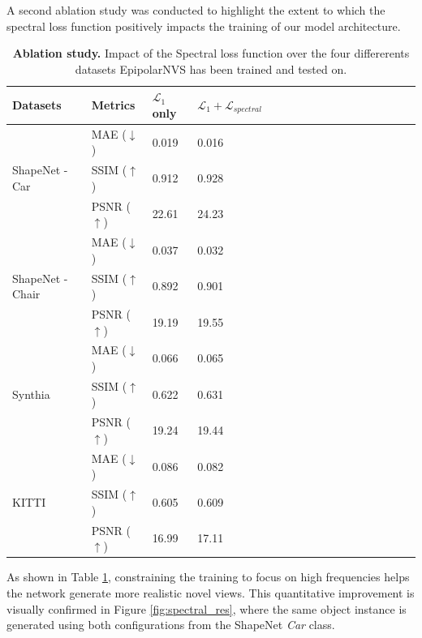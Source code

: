 A second ablation study was conducted to highlight the extent to which the spectral loss function positively impacts the training of our model architecture. 
\begin{table}[h!]
    \caption{\textbf{Ablation study.} Impact of the Spectral loss function over the four differerents datasets EpipolarNVS has been trained and tested on.}
    \label{tab:spectral}
\begin{center}
\begin{tabular}{@{}||lllllllllllllllll@{}}
  \toprule
  Datasets & Metrics  &$\mathcal{L}_{1}$ only  &  $\mathcal{L}_{1}+\mathcal{L}_{spectral}$ &   \\
  \midrule
  \multirow{3}{*}{ShapeNet - Car \citep{chang2015shapenet}} & MAE ($\downarrow$) &\hfil 0.019 & \hfil  \cellcolor{red!25}0.016 \\
  & SSIM ($\uparrow$) & \hfil0.912 & \hfil \cellcolor{red!25}0.928\\
  & PSNR ($\uparrow$)& \hfil22.61 & \hfil \cellcolor{red!25}24.23\\
  \midrule
  \multirow{3}{*}{ShapeNet - Chair \citep{chang2015shapenet}} & MAE ($\downarrow$) & \hfil 0.037 & \hfil \cellcolor{red!25}0.032\\
  & SSIM ($\uparrow$)&\hfil 0.892 & \hfil \cellcolor{red!25}0.901 \\
  & PSNR ($\uparrow$) & \hfil 19.19 & \hfil \cellcolor{red!25}19.55 \\
  \midrule
  \multirow{3}{*}{Synthia \citep{ros2016synthia}} & MAE ($\downarrow$)& \hfil 0.066 & \hfil \cellcolor{red!25}0.065\\
  & SSIM ($\uparrow$)& \hfil 0.622 & \hfil \cellcolor{red!25}0.631 \\
  & PSNR ($\uparrow$)& \hfil 19.24 & \hfil \cellcolor{red!25}19.44\\
  \midrule
  \multirow{3}{*}{KITTI \citep{geiger2012we}} & MAE ($\downarrow$)& \hfil 0.086 & \hfil \cellcolor{red!25}0.082\\
  & SSIM ($\uparrow$)& \hfil 0.605 & \hfil \cellcolor{red!25}0.609 \\
  & PSNR ($\uparrow$)& \hfil 16.99 & \hfil \cellcolor{red!25}17.11\\\hline

\end{tabular}
\end{center}
\end{table}

As shown in Table \ref{tab:spectral}, constraining the training to focus on high frequencies helps the network generate more realistic novel views. This quantitative improvement is visually confirmed in Figure \ref{fig:spectral_res}, where the same object instance is generated using both configurations from the ShapeNet \textit{Car} class.\newline 


